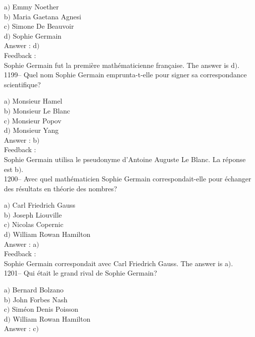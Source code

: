 ﻿\documentclass[letterpaper, 12pt]{article}
\begin{document}
a$)$ Emmy Noether \\
b$)$ Maria Gaetana Agnesi \\
c$)$ Simone De Beauvoir \\
d$)$ Sophie Germain\\

Answer : d$)$\\

Feedback : \\
Sophie Germain fut la premi\`ere math\'ematicienne fran\c caise.
The answer is d$)$.\\

1199-- Quel nom Sophie Germain emprunta-t-elle pour signer sa
correspondance scientifique?

a$)$ Monsieur Hamel \\
b$)$ Monsieur Le Blanc \\
c$)$ Monsieur Popov \\
d$)$ Monsieur Yang\\

Answer : b$)$\\

Feedback : \\
Sophie Germain utilisa le pseudonyme d'Antoine Auguste Le Blanc.  La
r\'eponse est b$)$.\\

1200-- Avec quel math\'ematicien Sophie Germain correspondait-elle
pour \'echanger des r\'esultats en th\'eorie des nombres?

a$)$ Carl Friedrich Gauss \\
b$)$ Joseph Liouville \\
c$)$ Nicolas Copernic \\
d$)$ William Rowan Hamilton\\

Answer : a$)$\\

Feedback : \\
Sophie Germain correspondait avec Carl Friedrich Gauss.
The answer is a$)$.\\

1201-- Qui \'etait le grand rival de Sophie Germain?

a$)$ Bernard Bolzano \\
b$)$ John Forbes Nash \\
c$)$ Sim\'eon Denis Poisson \\
d$)$ William Rowan Hamilton\\

Answer : c$)$\\
\end{document}
